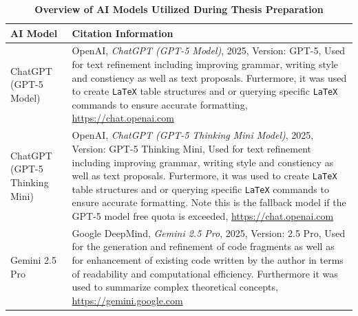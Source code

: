 \documentclass[12pt,a4paper]{article}
\begin{document}
\captionsetup{list=no} %
\begin{table}[H]
	\centering
	\begin{threeparttable}
		\caption{\textbf{Overview of AI Models Utilized During Thesis Preparation}}
		\label{list_of_ai_tools}
		\small
		\begin{tabular}{p{4cm} p{12cm}}
			\toprule
			\textbf{AI Model}             & \textbf{Citation Information}                                                                                                                                                                                                                                                                                                                                                                                                      \\
			\midrule
			ChatGPT (GPT-5 Model)         &
			OpenAI, \textit{ChatGPT (GPT-5 Model)}, 2025, Version: GPT-5, Used for text refinement including improving grammar, writing style and constiency as well as text proposals. Furtermore, it was used to create \texttt{LaTeX} table structures and or querying specific \texttt{LaTeX} commands to ensure accurate formatting, \url{https://chat.openai.com}                                                                                                        \\

			ChatGPT (GPT-5 Thinking Mini) &
			OpenAI, \textit{ChatGPT (GPT-5 Thinking Mini Model)}, 2025, Version: GPT-5 Thinking Mini, Used for text refinement including improving grammar, writing style and constiency as well as text proposals. Furtermore, it was used to create \texttt{LaTeX} table structures and or querying specific \texttt{LaTeX} commands to ensure accurate formatting. Note this is the fallback model if the GPT-5 model free quota is exceeded, \url{https://chat.openai.com} \\

			Gemini 2.5 Pro                &
			Google DeepMind, \textit{Gemini 2.5 Pro}, 2025, Version: 2.5 Pro, Used for the generation and refinement of code fragments as well as for enhancement of existing code written by the author in terms of readability and computational efficiency. Furthermore it was used to summarize complex theoretical concepts, \url{https://gemini.google.com}                                                                                                              \\


\end{tabular}
\end{threeparttable}
\end{table}
\end{document}
